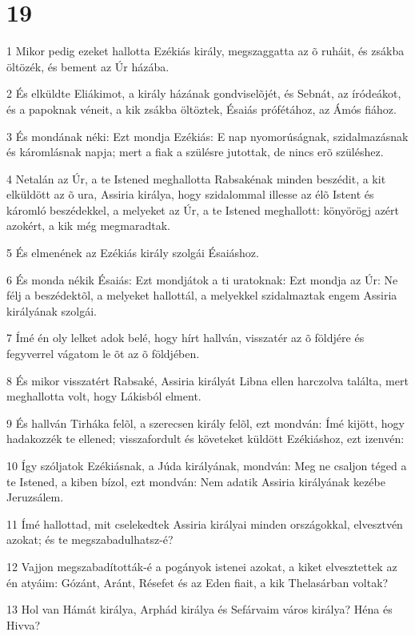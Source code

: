 \chapter{19}

\par 1 Mikor pedig ezeket hallotta Ezékiás király, megszaggatta az õ ruháit, és zsákba öltözék, és bement az Úr házába.
\par 2 És elküldte Eliákimot, a király házának gondviselõjét, és Sebnát, az íródeákot, és a papoknak véneit, a kik zsákba öltöztek, Ésaiás prófétához, az Ámós fiához.
\par 3 És mondának néki: Ezt mondja Ezékiás: E nap nyomorúságnak, szidalmazásnak és káromlásnak napja; mert a fiak a szülésre jutottak, de nincs erõ szüléshez.
\par 4 Netalán az Úr, a te Istened meghallotta Rabsakénak minden beszédit, a kit elküldött az õ ura, Assiria királya, hogy szidalommal illesse az élõ Istent és káromló beszédekkel, a melyeket az Úr, a te Istened meghallott: könyörögj azért azokért, a kik még megmaradtak.
\par 5 És elmenének az Ezékiás király szolgái Ésaiáshoz.
\par 6 És monda nékik Ésaiás: Ezt mondjátok a ti uratoknak: Ezt mondja az Úr: Ne félj a beszédektõl, a melyeket hallottál, a melyekkel szidalmaztak engem Assiria királyának szolgái.
\par 7 Ímé én oly lelket adok belé, hogy hírt hallván, visszatér az õ földjére és fegyverrel  vágatom le õt az õ földjében.
\par 8 És mikor visszatért Rabsaké, Assiria királyát Libna ellen harczolva találta, mert meghallotta volt, hogy Lákisból elment.
\par 9 És hallván Tirháka felõl, a szerecsen király felõl, ezt mondván: Ímé kijött, hogy hadakozzék te ellened; visszafordult és követeket küldött Ezékiáshoz, ezt izenvén:
\par 10 Így szóljatok Ezékiásnak, a Júda királyának, mondván: Meg ne csaljon téged a te Istened, a kiben bízol, ezt mondván: Nem adatik Assiria királyának kezébe Jeruzsálem.
\par 11 Ímé hallottad, mit cselekedtek Assiria királyai minden országokkal, elvesztvén azokat; és te megszabadulhatsz-é?
\par 12 Vajjon megszabadították-é a pogányok istenei azokat, a kiket elvesztettek az én atyáim: Gózánt, Aránt, Résefet és az Eden fiait, a kik Thelasárban voltak?
\par 13 Hol van Hámát királya, Arphád királya és Sefárvaim város királya? Héna és Hivva?
